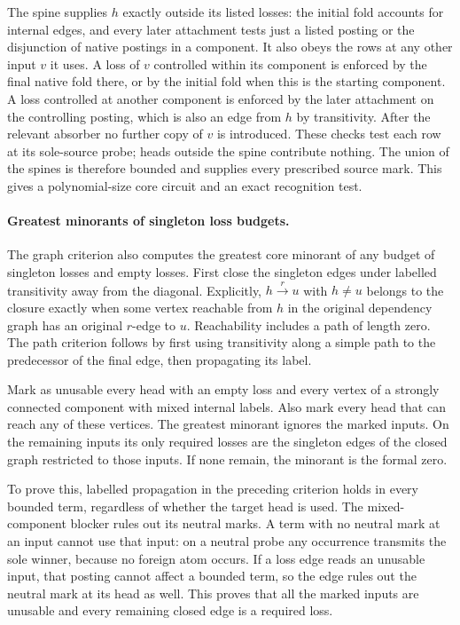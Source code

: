 The spine supplies $h$ exactly outside its
listed losses: the initial fold accounts
for internal edges, and every later
attachment tests just a listed posting or
the disjunction of native postings in a
component. It also obeys the rows at any
other input $v$ it uses. A loss of $v$
controlled within its component is enforced
by the final native fold there, or by the
initial fold when this is the starting
component. A loss controlled at another
component is enforced by the later
attachment on the controlling posting,
which is also an edge from $h$ by
transitivity. After the relevant absorber
no further copy of $v$ is introduced. These
checks test each row at its sole-source
probe; heads outside the spine contribute
nothing. The union of the spines is
therefore bounded and supplies every
prescribed source mark. This gives a
polynomial-size core circuit and an exact
recognition test.

\paragraph{Greatest minorants of singleton loss budgets.}
The graph criterion also computes the greatest core
minorant of any budget of singleton losses and empty
losses. First close the singleton edges under labelled
transitivity away from the diagonal. Explicitly,
$h\xrightarrow{r}u$ with $h\ne u$ belongs to the
closure exactly when some vertex reachable from
$h$ in the original dependency graph has an
original $r$-edge to $u$. Reachability includes
a path of length zero. The path criterion follows
by first using transitivity along a simple path
to the predecessor of the final edge, then
propagating its label.

Mark as unusable every head with an empty loss
and every vertex of a strongly connected component
with mixed internal labels. Also mark every head
that can reach any of these vertices. The greatest
minorant ignores the marked inputs. On the remaining
inputs its only required losses are the singleton
edges of the closed graph restricted to those inputs.
If none remain, the minorant is the formal zero.

To prove this, labelled propagation in the preceding
criterion holds in every bounded term, regardless
of whether the target head is used. The mixed-component
blocker rules out its neutral marks. A term with no
neutral mark at an input cannot use that input:
on a neutral probe any occurrence transmits the
sole winner, because no foreign atom occurs.
If a loss edge reads an unusable input, that
posting cannot affect a bounded term, so the
edge rules out the neutral mark at its head as
well. This proves that all the marked inputs
are unusable and every remaining closed edge is
a required loss.

